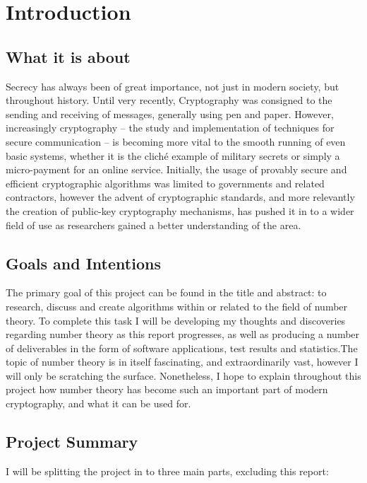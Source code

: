 \chapter{Introduction}
\label{Chapter1}

\section{What it is about}

Secrecy has always been of great importance, not just in modern society, but throughout history. Until very recently, Cryptography was consigned to the sending and receiving of messages, generally using pen and paper. However, increasingly cryptography -- the study and implementation of techniques for secure communication -- is becoming more vital to the smooth running of even basic systems, whether it is the clich\'{e} example of military secrets or simply a micro-payment for an online service. Initially, the usage of provably secure and efficient cryptographic algorithms was limited to governments and related contractors, however the advent of cryptographic standards, and more relevantly the creation of public-key cryptography mechanisms, has pushed it in to a wider field of use as researchers gained a better understanding of the area. 

\section{Goals and Intentions}

The primary goal of this project can be found in the title and abstract: to research, discuss and create algorithms within or related to the field of number theory. To complete this task I will be developing my thoughts and discoveries regarding number theory as this report progresses, as well as producing a number of deliverables in the form of software applications, test results and statistics.The topic of number theory is in itself fascinating, and extraordinarily vast, however I will only be scratching the surface. Nonetheless, I hope to explain throughout this project how number theory has become such an important part of modern cryptography, and what it can be used for.

\section{Project Summary}

I will be splitting the project in to three main parts, excluding this report:

